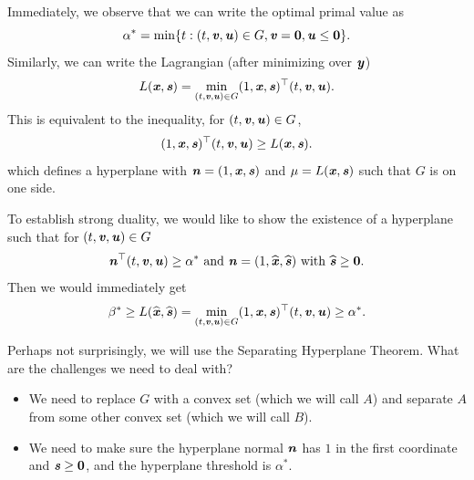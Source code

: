 Immediately, we observe that we can write the optimal primal value as
\begin{equation*} \alpha^* = \min \{t:(t,\vv,\uu) \in G, \vv = \veczero, \uu \leq \veczero\}. \end{equation*}
Similarly, we can write the Lagrangian (after minimizing over $\yy$)
\begin{equation*} L(\xx, \ss) = \min_{(t,\vv,\uu) \in G} (1, \xx, \ss)^{\trp} (t, \vv, \uu). \end{equation*}
This is equivalent to the inequality, for $(t,\vv,\uu) \in G$,
\begin{equation*} (1, \xx, \ss)^{\trp}(t, \vv, \uu) \geq L(\xx, \ss). \end{equation*}
which defines a hyperplane with $\nn = (1,\xx,\ss)$ and $\mu = L(\xx,
\ss)$ such that $G$ is on one side.

To establish strong duality, we would like to show the existence of a
hyperplane such that for $(t,\vv,\uu) \in G$
\[
  \nn^{\trp}(t, \vv, \uu) \geq \alpha^* \text{ and } \nn = (1,\xxhat,\sshat)
  \text{ with } \sshat \geq \veczero.
\]
Then we would immediately get
\begin{equation*}
 \beta^* \geq L(\xxhat,\sshat)= \min_{(t,\vv,\uu) \in G} (1, \xx,
 \ss)^{\trp} (t, \vv, \uu) \geq \alpha^* .
\end{equation*}

Perhaps not surprisingly, we will use the Separating
Hyperplane Theorem.
What are the challenges we need to deal with?
\begin{itemize}
\item We need to replace $G$ with a convex set (which we will call
  $A$) and separate $A$ from some other convex set (which we will call $B$).
\item We need to make sure the hyperplane normal $\nn$ has $1$ in the first
  coordinate and $\ss \geq \veczero$, and the hyperplane threshold is $\alpha^*$.
\end{itemize}




